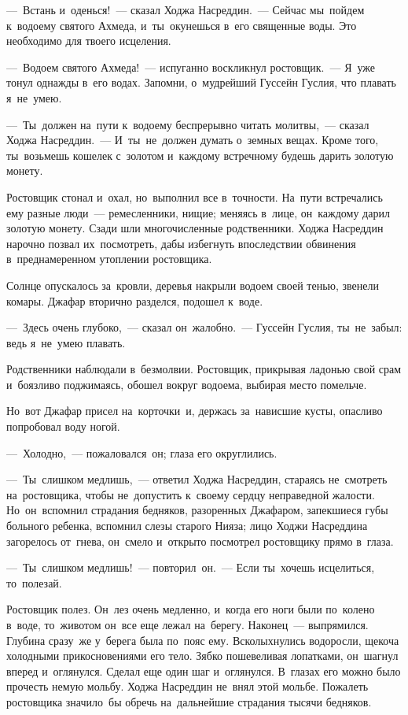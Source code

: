 \documentclass[12pt,a4paper]{book}
\begin{document}
—~Встань и~оденься!~— сказал Ходжа Насреддин.~— Сейчас мы~пойдем к~водоему святого Ахмеда, и~ты~окунешься в~его священные воды. Это необходимо для твоего исцеления.

—~Водоем святого Ахмеда!~— испуганно воскликнул ростовщик.~— Я~уже тонул однажды в~его водах. Запомни, о~мудрейший Гуссейн Гуслия, что плавать я~не~умею.

—~Ты~должен на~пути к~водоему беспрерывно читать молитвы,~— сказал Ходжа Насреддин.~— И~ты~не~должен думать о~земных вещах. Кроме того, ты~возьмешь кошелек с~золотом и~каждому встречному будешь дарить золотую монету.

Ростовщик стонал и~охал, но~выполнил все в~точности. На~пути встречались ему разные люди~— ремесленники, нищие; меняясь в~лице, он~каждому дарил золотую монету. Сзади шли многочисленные родственники. Ходжа Насреддин нарочно позвал их~посмотреть, дабы избегнуть впоследствии обвинения в~преднамеренном утоплении ростовщика.

Солнце опускалось за~кровли, деревья накрыли водоем своей тенью, звенели комары. Джафар вторично разделся, подошел к~воде.

—~Здесь очень глубоко,~— сказал он~жалобно.~— Гуссейн Гуслия, ты~не~забыл: ведь я~не~умею плавать.

Родственники наблюдали в~безмолвии. Ростовщик, прикрывая ладонью свой срам и~боязливо поджимаясь, обошел вокруг водоема, выбирая место помельче.

Но~вот Джафар присел на~корточки~и, держась за~нависшие кусты, опасливо попробовал воду ногой.

—~Холодно,~— пожаловался~он; глаза его округлились.

—~Ты~слишком медлишь,~— ответил Ходжа Насреддин, стараясь не~смотреть на~ростовщика, чтобы не~допустить к~своему сердцу неправедной жалости. Но~он~вспомнил страдания бедняков, разоренных Джафаром, запекшиеся губы больного ребенка, вспомнил слезы старого Нияза; лицо Ходжи Насреддина загорелось от~гнева, он~смело и~открыто посмотрел ростовщику прямо в~глаза.

—~Ты~слишком медлишь!~— повторил~он.~— Если ты~хочешь исцелиться, то~полезай.

Ростовщик полез. Он~лез очень медленно, и~когда его ноги были по~колено в~воде, то~животом он~все еще лежал на~берегу. Наконец~— выпрямился. Глубина сразу~же у~берега была по~пояс ему. Всколыхнулись водоросли, щекоча холодными прикосновениями его тело. Зябко пошевеливая лопатками, он~шагнул вперед и~оглянулся. Сделал еще один шаг и~оглянулся. В~глазах его можно было прочесть немую мольбу. Ходжа Насреддин не~внял этой мольбе. Пожалеть ростовщика значило~бы обречь на~дальнейшие страдания тысячи бедняков.
\end{document}
